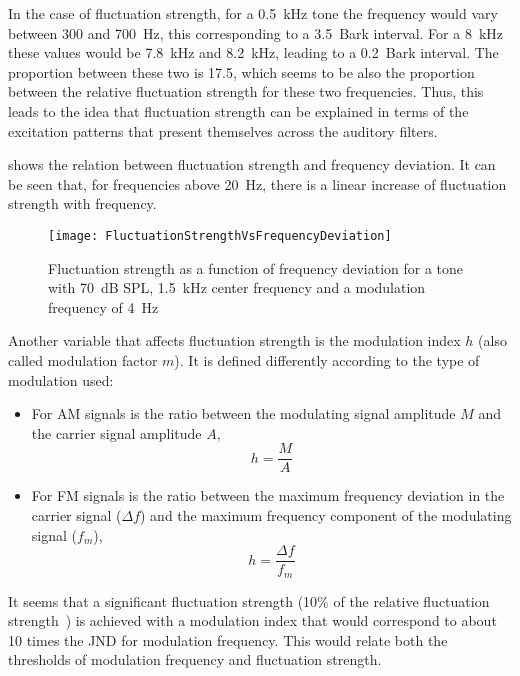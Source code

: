 \documentclass[../main.tex]{subfiles}
\begin{document}
\begin{theoreticalbackground}
In the case of fluctuation strength, for a 0.5~kHz tone the frequency would vary
between 300 and 700~Hz, this corresponding to a 3.5~Bark interval. For a 8~kHz
these values would be 7.8~kHz and 8.2~kHz, leading to a 0.2~Bark interval. The
proportion between these two is 17.5, which seems to be also the proportion
between the relative fluctuation strength for these two frequencies. Thus, this
leads to the idea that fluctuation strength can be explained in terms of the
excitation patterns that present themselves across the auditory filters.

 shows the relation between fluctuation strength
and frequency deviation. It can be seen that, for frequencies above 20~Hz, there
is a linear increase of fluctuation strength with frequency.

\begin{figure}[!ht]
  \centering
  \texttt{[image: FluctuationStrengthVsFrequencyDeviation]}
    \caption{Fluctuation strength as a function of frequency deviation for a
      tone with 70~dB SPL, 1.5~kHz center frequency and a modulation frequency
      of 4~Hz~\cite[pp. 251]{Fastl2007Psychoacoustics}}
\label{fig:flucstrenvsfreqdev}
\end{figure}

Another variable that affects fluctuation strength is the modulation index $h$
(also called modulation factor $m$). It is defined differently according to the
type of modulation used:
\begin{itemize}
  \item For \gls{AM} signals is the ratio between the modulating signal
    amplitude $M$ and the carrier signal amplitude $A$,
      \begin{equation}
        h=\frac{M}{A}
      \end{equation}
  \item For \gls{FM} signals is the ratio between the maximum frequency
    deviation in the carrier signal ($\Delta f$) and the maximum frequency
    component of the modulating signal ($f_m$),
      \begin{equation}
        h=\frac{\Delta f}{f_m}
      \end{equation}
\end{itemize}

It seems that a significant fluctuation strength (10\% of the relative
fluctuation strength~\cite[pp.~251]{Fastl2007Psychoacoustics}) is achieved with
a modulation index that would correspond to about 10 times the \gls{JND} for
modulation frequency. This would relate both the thresholds of modulation
frequency and fluctuation strength.


\end{theoreticalbackground}
\end{document}
